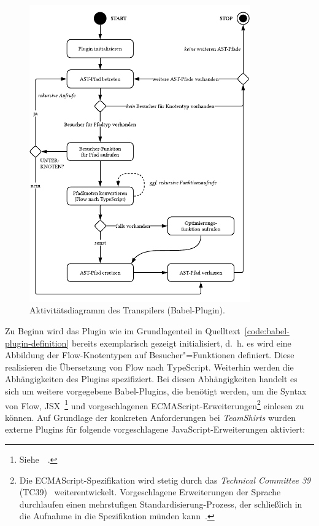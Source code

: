 \begin{figure}[tbp]
  \centering
  \includegraphics[width=0.85\textwidth]{src/4_Umsetzung/fig/activity-diagram-plugin.pdf}
  \caption{Aktivitätsdiagramm des Transpilers (Babel-Plugin).}
  \label{fig:activity-diagram-plugin}
\end{figure}


Zu Beginn wird das Plugin wie im Grundlagenteil in Quelltext~\ref{code:babel-plugin-definition} bereits exemplarisch gezeigt initialisiert, d.~h. es wird eine Abbildung der Flow-Knotentypen auf Besucher"=Funktionen definiert. Diese realisieren die Übersetzung von Flow nach TypeScript.
Weiterhin werden die Abhängigkeiten des Plugins spezifiziert. Bei diesen Abhängigkeiten handelt es sich um weitere vorgegebene Babel-Plugins, die benötigt werden, um die Syntax von Flow, JSX~\footnote{Siehe~~\autocite{SOFTWARE:JSX}.} und vorgeschlagenen ECMAScript-Erweiterungen\footnote{Die ECMAScript-Spezifikation wird stetig durch das \textit{Technical Committee 39} (TC39)~\autocite{TC39_COMMITTEE} weiterentwickelt. Vorgeschlagene Erweiterungen der Sprache durchlaufen einen mehrstufigen Standardisierung-Prozess, der schließlich in die Aufnahme in die Spezifikation münden kann~\autocite{TC39_PROCESS}.} einlesen zu können. Auf Grundlage der konkreten Anforderungen bei \textit{TeamShirts} wurden externe Plugins für folgende vorgeschlagene JavaScript-Erweiterungen aktiviert:

